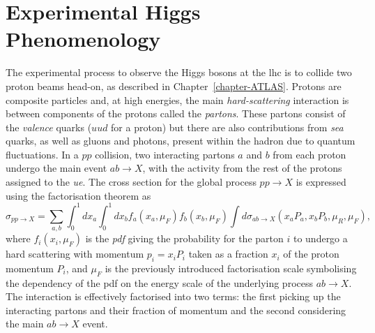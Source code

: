 \section{Experimental Higgs Phenomenology}\label{th-sec-higphe}
The experimental process to observe the Higgs bosons at the \gls{lhc} is to collide two proton beams head-on, as described in Chapter~\ref{chapter-ATLAS}. Protons are composite particles and, at high energies, the main \textit{hard-scattering} interaction is between components of the protons called the \textit{partons}. These partons consist of the \textit{valence} quarks ($uud$ for a proton) but there are also contributions from \textit{sea} quarks, as well as gluons and photons, present within the hadron due to quantum fluctuations. In a $pp$ collision, two interacting partons $a$ and $b$ from each proton undergo the main event $ab \rightarrow X$, with the activity from the rest of the protons assigned to the \textit{\gls{ue}}. The cross section for the global process $pp \rightarrow X$ is expressed using the factorisation theorem \cite{collins2004factorization} as 
\begin{equation}
\sigma_{pp\rightarrow X} = \sum_{a,b} \int_0^1 dx_a \int_0^1 dx_b f_a(x_a, \mu_F) f_b(x_b, \mu_F) \int d\sigma_{ab\rightarrow X}\left(x_aP_a, x_bP_b, \mu_R, \mu_F \right),
\end{equation}
where $f_i(x_i, \mu_F)$ is the \textit{\gls{pdf}} giving the probability for the parton $i$ to undergo a hard scattering with momentum $p_i = x_i P_i$ taken as a fraction $x_i$ of the proton momentum $P_i$, and $\mu_F$ is the previously introduced factorisation scale symbolising the dependency of the \gls{pdf} on the energy scale of the underlying process $ab \rightarrow X$. The interaction is effectively factorised into two terms: the first picking up the interacting partons and their fraction of momentum and the second considering the main $ab \rightarrow X$ event.\\

